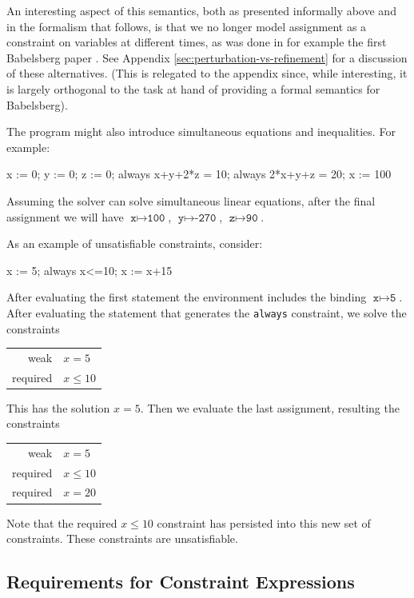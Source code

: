 \documentclass{article}
\begin{document}
An interesting aspect of this semantics, both as presented informally
above and in the formalism that follows, is that we no longer model
assignment as a constraint on variables at different times, as was
done in for example the first Babelsberg paper
\cite{felgentreff-babelsberg-tr}.  See Appendix
\ref{sec:perturbation-vs-refinement} for a discussion of these
alternatives.  (This is relegated to the appendix since, while
interesting, it is largely orthogonal to the task at hand of providing
a formal semantics for Babelsberg).

The program might also introduce simultaneous equations and
inequalities.  For example:

\begin{example}
x := 0;
y := 0;
z := 0;
always x+y+2*z = 10;
always 2*x+y+z = 20;
x := 100
\end{example}

Assuming the solver can solve simultaneous linear equations,
after the final assignment we will have 
$\texttt{x} \mapsto \texttt{100}$,
$\texttt{y} \mapsto \texttt{-270}$,
$\texttt{z} \mapsto \texttt{90}$.

As an example of unsatisfiable constraints, consider:

\begin{example}
x := 5;
always x<=10;
x := x+15
\end{example}

After evaluating the first statement the environment includes the
binding $\texttt{x} \mapsto \texttt{5}$.  After evaluating the
statement that generates the \texttt{always} constraint, we solve the
constraints

\begin{tabular}{rl}
weak     & $x=5$ \\
required & $x \leq 10$
\end{tabular}

This has the solution $x=5$.  Then we evaluate the last
assignment, resulting the constraints

\begin{tabular}{rl}
weak     & $x=5$ \\
required & $x \leq 10$ \\
required & $x = 20$
\end{tabular}

Note that the required $x \leq 10$ constraint has persisted into this
new set of constraints.  These constraints are unsatisfiable.

\subsection{Requirements for Constraint Expressions}
\label{sec:constraint-expression-requirements} 
\end{document}
